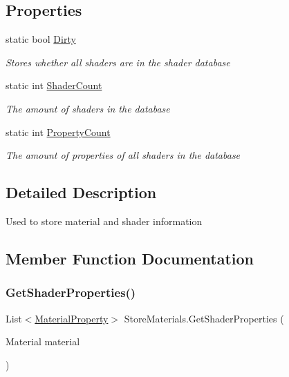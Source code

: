\subsection*{Properties}
\begin{DoxyCompactItemize}
\item 
static bool \hyperlink{class_store_materials_abc3745cd424bdab53c1a656a1696556b}{Dirty}
\begin{DoxyCompactList}\small\item\em Stores whether all shaders are in the shader database \end{DoxyCompactList}\item 
static int \hyperlink{class_store_materials_a7e05152810930b9af575d7ef1293b838}{Shader\+Count}
\begin{DoxyCompactList}\small\item\em The amount of shaders in the database \end{DoxyCompactList}\item 
static int \hyperlink{class_store_materials_af633ae56d181630940693225d9da628a}{Property\+Count}
\begin{DoxyCompactList}\small\item\em The amount of properties of all shaders in the database \end{DoxyCompactList}\end{DoxyCompactItemize}


\subsection{Detailed Description}
Used to store material and shader information 



\subsection{Member Function Documentation}
\mbox{\label{class_store_materials_a5d76730b8382318d4866d67c61a42f51}} 
\subsubsection{\texorpdfstring{Get\+Shader\+Properties()}{GetShaderProperties()}}
{\footnotesize\ttfamily List$<$\hyperlink{class_store_materials_1_1_material_property}{Material\+Property}$>$ Store\+Materials.\+Get\+Shader\+Properties (\begin{DoxyParamCaption}\item[{Material}]{material }\end{DoxyParamCaption})\hspace{0.3cm}{\ttfamily [inline]}}



